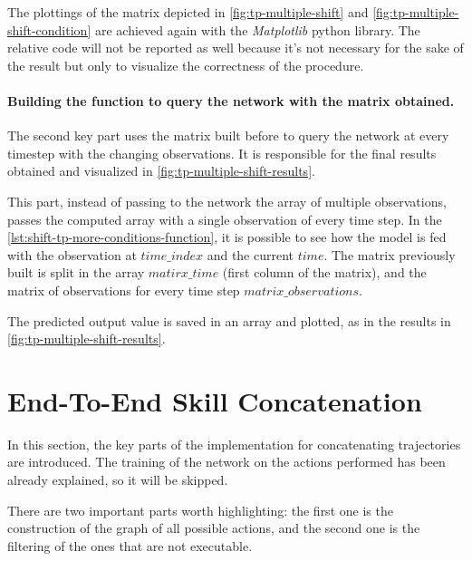 The plottings of the matrix depicted in \cref{fig:tp-multiple-shift} and \cref{fig:tp-multiple-shift-condition} are achieved again with the \emph{Matplotlib} python library. The relative code will not be reported as well because it's not necessary for the sake of the result but only to visualize the correctness of the procedure.


\paragraph{Building the function to query the network with the matrix obtained. }
The second key part uses the matrix built before to query the network at every timestep with the changing observations. It is responsible for the final results obtained and visualized in \cref{fig:tp-multiple-shift-results}.

This part, instead of passing to the network the array of multiple observations, passes the computed array with a single observation of every time step. In the \cref{lst:shift-tp-more-conditions-function}, it is possible to see how the model is fed with the observation at $time\_index$ and the current $time$. The matrix previously built is split in the array $matirx\_time$  (first column of the matrix), and the matrix of observations for every time step $matrix\_observations$.



The predicted output value is saved in an array and plotted, as in the results in \cref{fig:tp-multiple-shift-results}.

\newpage
\section{End-To-End Skill Concatenation}

In this section, the key parts of the implementation for concatenating trajectories are introduced. The training of the network on the actions performed has been already explained, so it will be skipped. 

There are two important parts worth highlighting: the first one is the construction of the graph of all possible actions, and the second one is the filtering of the ones that are not executable. 

